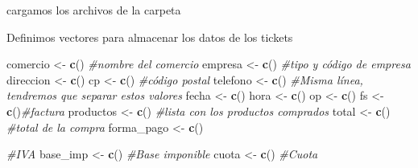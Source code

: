 \documentclass[,,,oneauthor,pdftex]{Definitions/mdpi}
\newenvironment{Shaded}{\begin{snugshade}}{\end{snugshade}}
\newcommand{\AttributeTok}[1]{\textcolor[rgb]{0.13,0.29,0.53}{#1}}
\newcommand{\CommentTok}[1]{\textcolor[rgb]{0.56,0.35,0.01}{\textit{#1}}}
\newcommand{\ConstantTok}[1]{\textcolor[rgb]{0.56,0.35,0.01}{#1}}
\newcommand{\FunctionTok}[1]{\textcolor[rgb]{0.13,0.29,0.53}{\textbf{#1}}}
\newcommand{\NormalTok}[1]{#1}
\newcommand{\OtherTok}[1]{\textcolor[rgb]{0.56,0.35,0.01}{#1}}
\newcommand{\SpecialCharTok}[1]{\textcolor[rgb]{0.81,0.36,0.00}{\textbf{#1}}}
\newcommand{\StringTok}[1]{\textcolor[rgb]{0.31,0.60,0.02}{#1}}
\begin{document}
cargamos los archivos de la carpeta

\begin{Shaded}
\end{Shaded}

Definimos vectores para almacenar los datos de los tickets

\begin{Shaded}
\begin{Highlighting}[]
\NormalTok{comercio }\OtherTok{\textless{}{-}} \FunctionTok{c}\NormalTok{() }\CommentTok{\#nombre del comercio}
\NormalTok{empresa }\OtherTok{\textless{}{-}} \FunctionTok{c}\NormalTok{() }\CommentTok{\#tipo y código de empresa}
\NormalTok{direccion }\OtherTok{\textless{}{-}} \FunctionTok{c}\NormalTok{() }
\NormalTok{cp }\OtherTok{\textless{}{-}} \FunctionTok{c}\NormalTok{() }\CommentTok{\#código postal}
\NormalTok{telefono }\OtherTok{\textless{}{-}} \FunctionTok{c}\NormalTok{() }\CommentTok{\#Misma línea, tendremos que separar estos valores}
\NormalTok{fecha }\OtherTok{\textless{}{-}} \FunctionTok{c}\NormalTok{()}
\NormalTok{hora }\OtherTok{\textless{}{-}} \FunctionTok{c}\NormalTok{()}
\NormalTok{op }\OtherTok{\textless{}{-}} \FunctionTok{c}\NormalTok{()}
\NormalTok{fs }\OtherTok{\textless{}{-}} \FunctionTok{c}\NormalTok{()}\CommentTok{\#factura}
\NormalTok{productos }\OtherTok{\textless{}{-}} \FunctionTok{c}\NormalTok{() }\CommentTok{\#lista con los productos comprados}
\NormalTok{total }\OtherTok{\textless{}{-}} \FunctionTok{c}\NormalTok{() }\CommentTok{\#total de la compra}
\NormalTok{forma\_pago }\OtherTok{\textless{}{-}} \FunctionTok{c}\NormalTok{()}

\CommentTok{\#IVA}
\NormalTok{base\_imp }\OtherTok{\textless{}{-}} \FunctionTok{c}\NormalTok{() }\CommentTok{\#Base imponible}
\NormalTok{cuota }\OtherTok{\textless{}{-}} \FunctionTok{c}\NormalTok{() }\CommentTok{\#Cuota }
\end{Highlighting}
\end{Shaded}
\end{document}
